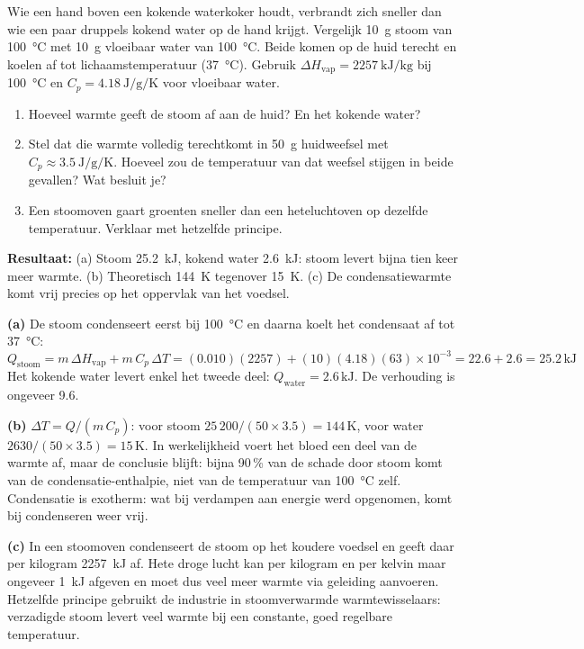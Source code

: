 \begin{oefening}
Wie een hand boven een kokende waterkoker houdt, verbrandt zich sneller dan wie een paar druppels kokend water op de hand krijgt. Vergelijk \SI{10}{\gram} stoom van \SI{100}{\celsius} met \SI{10}{\gram} vloeibaar water van \SI{100}{\celsius}. Beide komen op de huid terecht en koelen af tot lichaamstemperatuur (\SI{37}{\celsius}). Gebruik $\Delta H_{\text{vap}} = \SI{2257}{\kilo\joule\per\kilogram}$ bij \SI{100}{\celsius} en $C_p = \SI{4.18}{\joule\per\gram\per\kelvin}$ voor vloeibaar water.
\begin{enumerate}
\item[(a)] Hoeveel warmte geeft de stoom af aan de huid? En het kokende water?
\item[(b)] Stel dat die warmte volledig terechtkomt in \SI{50}{\gram} huidweefsel met $C_p \approx \SI{3.5}{\joule\per\gram\per\kelvin}$. Hoeveel zou de temperatuur van dat weefsel stijgen in beide gevallen? Wat besluit je?
\item[(c)] Een stoomoven gaart groenten sneller dan een heteluchtoven op dezelfde temperatuur. Verklaar met hetzelfde principe.
\end{enumerate}
\end{oefening}
\begin{oplossing}
\textbf{Resultaat:} (a) Stoom \SI{25.2}{\kilo\joule}, kokend water \SI{2.6}{\kilo\joule}: stoom levert bijna tien keer meer warmte. (b) Theoretisch \SI{+144}{\kelvin} tegenover \SI{+15}{\kelvin}. (c) De condensatiewarmte komt vrij precies op het oppervlak van het voedsel.

\textbf{(a)} De stoom condenseert eerst bij \SI{100}{\celsius} en daarna koelt het condensaat af tot \SI{37}{\celsius}:
\[
Q_{\text{stoom}} = m\,\Delta H_{\text{vap}} + m\,C_p\,\Delta T = (0.010)(2257) + (10)(4.18)(63)\times10^{-3} = 22.6 + 2.6 = 25.2\,\mathrm{kJ}
\]
Het kokende water levert enkel het tweede deel: $Q_{\text{water}} = 2.6\,\mathrm{kJ}$. De verhouding is ongeveer 9.6.

\textbf{(b)} $\Delta T = Q/(m\,C_p)$: voor stoom $25\,200/(50 \times 3.5) = 144\,\mathrm{K}$, voor water $2630/(50\times3.5) = 15\,\mathrm{K}$. In werkelijkheid voert het bloed een deel van de warmte af, maar de conclusie blijft: bijna 90\,\% van de schade door stoom komt van de condensatie-enthalpie, niet van de temperatuur van \SI{100}{\celsius} zelf. Condensatie is exotherm: wat bij verdampen aan energie werd opgenomen, komt bij condenseren weer vrij.

\textbf{(c)} In een stoomoven condenseert de stoom op het koudere voedsel en geeft daar per kilogram \SI{2257}{\kilo\joule} af. Hete droge lucht kan per kilogram en per kelvin maar ongeveer \SI{1}{\kilo\joule} afgeven en moet dus veel meer warmte via geleiding aanvoeren. Hetzelfde principe gebruikt de industrie in stoomverwarmde warmtewisselaars: verzadigde stoom levert veel warmte bij een constante, goed regelbare temperatuur.
\end{oplossing}

